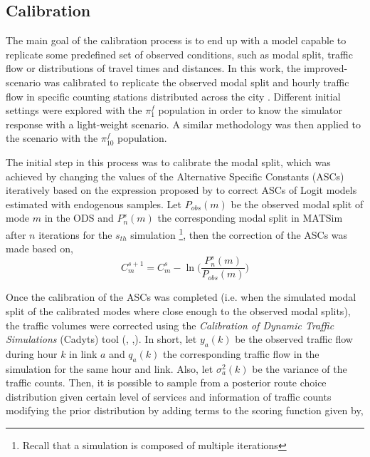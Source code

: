 \documentclass[Journal,letterpaper]{ascelike-new}
\begin{document}
\subsection{Calibration}

The main goal of the calibration process is to end up with a model capable to replicate some predefined set of observed conditions, such as modal split, traffic flow or distributions of travel times and distances. In this work, the improved-scenario was calibrated to replicate the observed modal split and hourly traffic flow in specific counting stations distributed across the city \citep{AFOROS2013}. Different initial settings were explored with the $\pi_{1}^{f}$ population in order to know the simulator response with a light-weight scenario. A similar methodology was then applied to the scenario with the $\pi_{10}^{f}$ population.

The initial step in this process was to calibrate the modal split, which was achieved by changing the values of the Alternative Specific Constants (ASCs) iteratively based on the expression proposed by \cite{manski1977estimation} to correct ASCs of Logit models estimated with endogenous samples. Let $P_{obs}(m)$ be the observed modal split of mode $m$ in the ODS and $P_{n}^{s}(m)$ the corresponding modal split in MATSim after $n$ iterations for the $s_{th}$ simulation \footnote{Recall that a simulation is composed of multiple iterations}, then the correction of the ASCs was made based on,
\begin{equation}
C_{m}^{s+1}=C_{m}^{s}-\ln\Bigg(\frac{P_{n}^{s}(m)}{P_{obs}(m)}\Bigg)
\end{equation}

Once the calibration of the ASCs was completed (i.e. when the simulated modal split of the calibrated modes where close enough to the observed modal splits), the traffic volumes were corrected using the \emph{Calibration of Dynamic Traffic Simulations} (Cadyts) tool (\cite{cadytsmanual}, \cite{flotterod2011bayesian},\cite{CaDyTS}). In short, let $y_{a}(k)$ be the observed traffic flow during hour $k$ in link $a$ and $q_{a}(k)$ the corresponding traffic flow in the simulation for the same hour and link. Also, let $\sigma_{a}^2(k)$ be the variance of the traffic counts. Then, it is possible to sample from a posterior route choice distribution given certain level of services and information of traffic counts modifying the prior distribution by adding terms to the scoring function given by\citep{flotterod2011bayesian},
\end{document}
